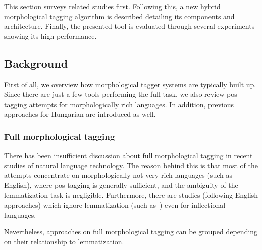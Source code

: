 This section surveys related studies first. 
Following this, a new hybrid morphological tagging algorithm is described detailing its components and architecture. 
Finally, the presented tool is evaluated through several experiments showing its high performance.

\subsection{Background}

First of all, we overview how morphological tagger systems are typically built up. 
Since there are just a few tools performing the full task, we also review \gls{pos} tagging attempts for morphologically rich languages. 
In addition, previous approaches for Hungarian are introduced as well. %

\subsubsection{Full morphological tagging}

There has been insufficient discussion about full morphological tagging in recent studies of natural language technology. 
The reason behind this is that most of the attempts concentrate on morphologically not very rich languages (such as English), where \gls{pos} tagging is generally sufficient, and the ambiguity of the lemmatization task is negligible. 
Furthermore, there are studies (following English approaches) which ignore lemmatization (such as~\cite{Hajic1998a,Tufis1998,Silfverberg2011}) even for inflectional languages. 

Nevertheless, approaches on full morphological tagging can be grouped depending on their relationship to lemmatization.

